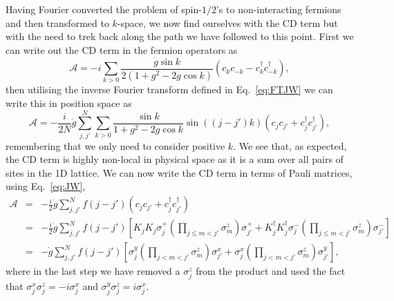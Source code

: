 Having Fourier converted the problem of spin-$1/2$'s to non-interacting fermions and then transformed to $k$-space, we now find ourselves with the CD term but with the need to trek back along the path we have followed to this point. First we can write out the CD term in the fermion operators as
\begin{equation}
\mathcal{A} = - i \sum_{k>0} \frac{\dot{g}\sin k }{2\left( 1 + g^2 - 2g\cos k \right)} \left( c_k c_{-k} - c_k^\dagger c_{-k}^\dagger \right),
\end{equation}
then utilising the inverse Fourier transform defined in Eq.~\eqref{eq:FTJW} we can write this in position space as
\begin{equation}
\mathcal{A} = - \frac{i}{2N} \dot{g} \sum_{j,j'}^N \sum_{k>0} \frac{\sin k}{1 + g^2 - 2g\cos k} \sin \left( \left( j - j' \right) k \right) \left( c_j c_{j'} + c_j^\dagger c_{j'}^\dagger \right),
\end{equation}
remembering that we only need to consider positive $k$. We see that, as expected, the CD term is highly non-local in physical space as it is a sum over all pairs of sites in the 1D lattice. We can now write the CD term in terms of Pauli matrices, using Eq.~\eqref{eq:JW},
\begin{eqnarray}
\mathcal{A} & = & - \frac{i}{2} \dot{g} \sum_{j,j'}^N f\left( j - j' \right) \left( c_j c_{j'} + c_j^\dagger c_{j'}^\dagger \right) \nonumber \\
& = &  - \frac{i}{2} \dot{g} \sum_{j,j'}^N f\left( j - j' \right) \left[ K_j K_j \sigma_j^+ \left( \prod_{j \leq m < j'}  \sigma_m^z \right) \sigma_{j'}^+ +  K_j^\dagger K_j^\dagger \sigma_j^- \left( \prod_{j \leq m < j'}  \sigma_m^z \right) \sigma_{j'}^- \right] \nonumber \\
& = & - \dot{g} \sum_{j,j'}^N f\left( j - j' \right) \left[ \sigma_j^y \left( \prod_{j < m < j'}  \sigma_m^z \right) \sigma_{j'}^x + \sigma_j^x \left( \prod_{j < m < j'}  \sigma_m^z \right) \sigma_{j'}^y \right],
\label{eq:HCDIsing}
\end{eqnarray}
where in the last step we have removed a $\sigma_j^z$ from the product and used the fact that $\sigma^x_j \sigma_j^z = - i \sigma_j^x$ and $\sigma_j^y \sigma_j^z = i \sigma_j^x$. 

